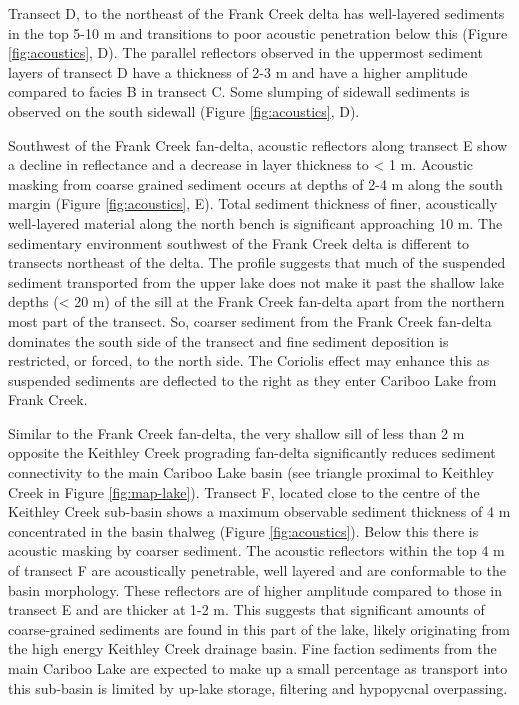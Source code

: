 \documentclass[Royal,times,doublespace,sageh]{sagej}
\begin{document}
Transect D, to the northeast of the Frank Creek delta has well-layered
sediments in the top 5-10 m and transitions to poor acoustic penetration
below this (Figure \ref{fig:acoustics}, D). The parallel reflectors
observed in the uppermost sediment layers of transect D have a thickness
of 2-3 m and have a higher amplitude compared to facies B in transect C.
Some slumping of sidewall sediments is observed on the south sidewall
(Figure \ref{fig:acoustics}, D).

Southwest of the Frank Creek fan-delta, acoustic reflectors along
transect E show a decline in reflectance and a decrease in layer
thickness to \textless{} 1 m. Acoustic masking from coarse grained
sediment occurs at depths of 2-4 m along the south margin (Figure
\ref{fig:acoustics}, E). Total sediment thickness of finer, acoustically
well-layered material along the north bench is significant approaching
10 m. The sedimentary environment southwest of the Frank Creek delta is
different to transects northeast of the delta. The profile suggests that
much of the suspended sediment transported from the upper lake does not
make it past the shallow lake depths (\textless{} 20 m) of the sill at
the Frank Creek fan-delta apart from the northern most part of the
transect. So, coarser sediment from the Frank Creek fan-delta dominates
the south side of the transect and fine sediment deposition is
restricted, or forced, to the north side. The Coriolis effect may
enhance this as suspended sediments are deflected to the right as they
enter Cariboo Lake from Frank Creek.

Similar to the Frank Creek fan-delta, the very shallow sill of less than
2 m opposite the Keithley Creek prograding fan-delta significantly
reduces sediment connectivity to the main Cariboo Lake basin (see
triangle proximal to Keithley Creek in Figure \ref{fig:map-lake}).
Transect F, located close to the centre of the Keithley Creek sub-basin
shows a maximum observable sediment thickness of 4 m concentrated in the
basin thalweg (Figure \ref{fig:acoustics}). Below this there is acoustic
masking by coarser sediment. The acoustic reflectors within the top 4 m
of transect F are acoustically penetrable, well layered and are
conformable to the basin morphology. These reflectors are of higher
amplitude compared to those in transect E and are thicker at 1-2 m. This
suggests that significant amounts of coarse-grained sediments are found
in this part of the lake, likely originating from the high energy
Keithley Creek drainage basin. Fine faction sediments from the main
Cariboo Lake are expected to make up a small percentage as transport
into this sub-basin is limited by up-lake storage, filtering and
hypopycnal overpassing.
\end{document}
